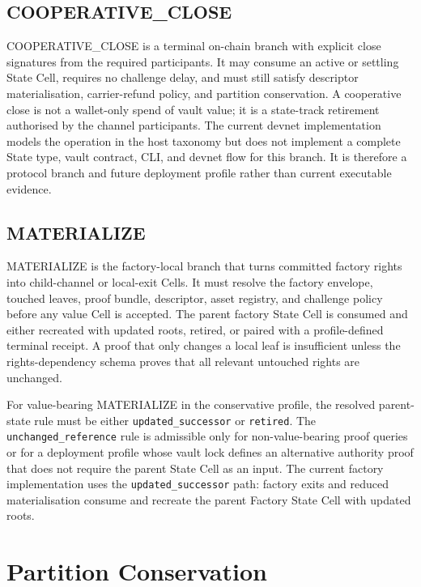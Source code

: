 \documentclass[a4paper,11pt]{article}
\begin{document}
\subsection{COOPERATIVE\_CLOSE}

\textsf{COOPERATIVE\_CLOSE} is a terminal on-chain branch with explicit close
signatures from the required participants. It may consume an active or settling
State Cell, requires no challenge delay, and must still satisfy descriptor
materialisation, carrier-refund policy, and partition conservation. A
cooperative close is not a wallet-only spend of vault value; it is a
state-track retirement authorised by the channel participants.
The current devnet implementation models the operation in the host taxonomy but
does not implement a complete State type, vault contract, CLI, and devnet flow
for this branch. It is therefore a protocol branch and future deployment profile
rather than current executable evidence.

\subsection{MATERIALIZE}

\textsf{MATERIALIZE} is the factory-local branch that turns committed factory
rights into child-channel or local-exit Cells. It must resolve the factory
envelope, touched leaves, proof bundle, descriptor, asset registry, and
challenge policy before any value Cell is accepted. The parent factory State
Cell is consumed and either recreated with updated roots, retired, or paired
with a profile-defined terminal receipt. A proof that only changes a local
leaf is insufficient unless the rights-dependency schema proves that all
relevant untouched rights are unchanged.

For value-bearing \textsf{MATERIALIZE} in the conservative profile, the
resolved parent-state rule must be either \texttt{updated\_successor} or
\texttt{retired}. The \texttt{unchanged\_reference} rule is admissible only for
non-value-bearing proof queries or for a deployment profile whose vault lock
defines an alternative authority proof that does not require the parent State
Cell as an input.
The current factory implementation uses the \texttt{updated\_successor} path:
factory exits and reduced materialisation consume and recreate the parent
Factory State Cell with updated roots.

\clearpage
\section{Partition Conservation}
\end{document}
